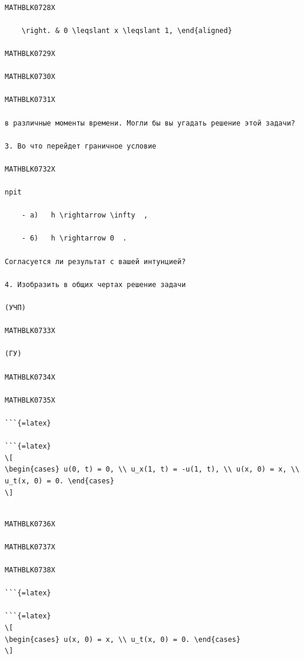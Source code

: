\documentclass[
]{article}
\begin{document}
\begin{verbatim}

MATHBLK0728X

    \right. & 0 \leqslant x \leqslant 1, \end{aligned}

MATHBLK0729X

MATHBLK0730X

MATHBLK0731X

в различные моменты времени. Могли бы вы угадать решение этой задачи?

3. Во что перейдет граничное условие

MATHBLK0732X

npit

    - a)   h \rightarrow \infty  ,

    - 6)   h \rightarrow 0  .

Согласуется ли результат с вашей интунцией?

4. Изобразить в общих чертах решение задачи

(УЧП)

MATHBLK0733X

(ГУ)

MATHBLK0734X

MATHBLK0735X

```{=latex}

```{=latex}
\[
\begin{cases} u(0, t) = 0, \\ u_x(1, t) = -u(1, t), \\ u(x, 0) = x, \\ u_t(x, 0) = 0. \end{cases}
\]
\end{verbatim}

\begin{verbatim}

MATHBLK0736X

MATHBLK0737X

MATHBLK0738X

```{=latex}

```{=latex}
\[
\begin{cases} u(x, 0) = x, \\ u_t(x, 0) = 0. \end{cases}
\]
\end{verbatim}
\end{document}
